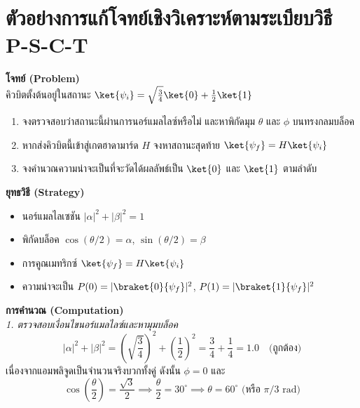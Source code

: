\section{ตัวอย่างการแก้โจทย์เชิงวิเคราะห์ตามระเบียบวิธี P-S-C-T}

\begin{psctexample}
\textbf{โจทย์ (Problem)} \\
คิวบิตตั้งต้นอยู่ในสถานะ $\ket{\psi_i} = \sqrt{\frac{3}{4}}\ket{0} + \frac{1}{2}\ket{1}$ 
\begin{enumerate}
    \item จงตรวจสอบว่าสถานะนี้ผ่านการนอร์แมลไลซ์หรือไม่ และหาพิกัดมุม $\theta$ และ $\phi$ บนทรงกลมบล็อค
    \item หากส่งคิวบิตนี้เข้าสู่เกตฮาดามาร์ด $H$ จงหาสถานะสุดท้าย $\ket{\psi_f} = H\ket{\psi_i}$
    \item จงคำนวณความน่าจะเป็นที่จะวัดได้ผลลัพธ์เป็น $\ket{0}$ และ $\ket{1}$ ตามลำดับ
\end{enumerate}

\textbf{ยุทธวิธี (Strategy)} \\
\begin{itemize}
    \item นอร์แมลไลเซชัน $|\alpha|^2 + |\beta|^2 = 1$
    \item พิกัดบล็อค $\cos(\theta/2) = \alpha$, $\sin(\theta/2) = \beta$
    \item การคูณเมทริกซ์ $\ket{\psi_f} = H \ket{\psi_i}$
    \item ความน่าจะเป็น $P(0) = |\braket{0}{\psi_f}|^2$, $P(1) = |\braket{1}{\psi_f}|^2$
\end{itemize}

\textbf{การคำนวณ (Computation)} \\
\textit{1. ตรวจสอบเงื่อนไขนอร์แมลไลซ์และหามุมบล็อค}
\begin{equation}
|\alpha|^2 + |\beta|^2 = \left(\sqrt{\frac{3}{4}}\right)^2 + \left(\frac{1}{2}\right)^2 = \frac{3}{4} + \frac{1}{4} = 1.0 \quad \text{(ถูกต้อง)}
\end{equation}
เนื่องจากแอมพลิจูดเป็นจำนวนจริงบวกทั้งคู่ ดังนั้น $\phi = 0$ และ
\begin{equation}
\cos\left(\frac{\theta}{2}\right) = \frac{\sqrt{3}}{2} \implies \frac{\theta}{2} = 30^\circ \implies \theta = 60^\circ \text{ (หรือ } \pi/3 \text{ rad)}
\end{equation}


\end{psctexample}
